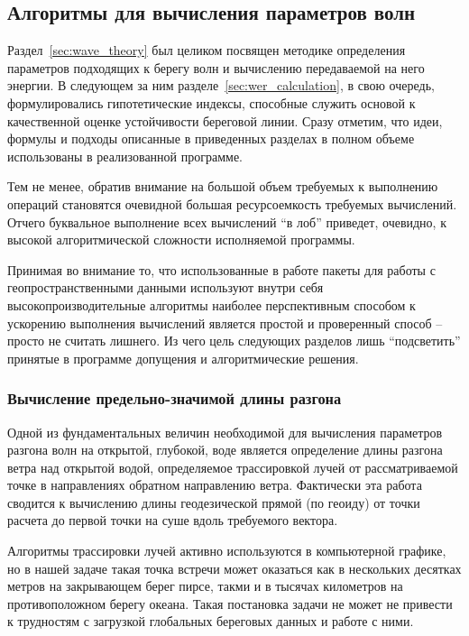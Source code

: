 
\subsection{Алгоритмы для вычисления параметров волн}


Раздел~\ref{sec:wave_theory} был целиком посвящен методике определения параметров подходящих к берегу волн и вычислению передаваемой на него энергии.
В следующем за ним разделе~\ref{sec:wer_calculation}, в свою очередь, формулировались гипотетические индексы, способные служить основой к качественной оценке устойчивости береговой линии.
Сразу отметим, что идеи, формулы и подходы описанные в приведенных разделах в полном объеме использованы в реализованной программе.

Тем не менее, обратив внимание на большой объем требуемых к выполнению операций становятся очевидной большая ресурсоемкость требуемых вычислений. 
Отчего буквальное выполнение всех вычислений \enquote{в лоб} приведет, очевидно, к высокой алгоритмической сложности исполняемой программы.

Принимая во внимание то, что использованные в работе пакеты для работы с геопространственными данными используют внутри себя высокопроизводительные алгоритмы наиболее перспективным способом к ускорению выполнения вычислений является простой и проверенный способ -- просто не считать лишнего.
Из чего цель следующих разделов лишь \enquote{подсветить} принятые в программе допущения и алгоритмические решения.

\subsubsection{Вычисление предельно-значимой длины разгона}

Одной из фундаментальных величин необходимой для вычисления параметров разгона волн на открытой, глубокой, воде является определение длины разгона ветра над открытой водой, определяемое трассировкой лучей от рассматриваемой точке в направлениях обратном направлению ветра.
Фактически эта работа сводится к вычислению длины геодезической прямой (по геоиду) от точки расчета до первой точки на суше вдоль требуемого вектора.

Алгоритмы трассировки лучей активно используются в компьютерной графике, но в нашей задаче такая точка встречи может оказаться как в нескольких десятках метров на закрывающем берег пирсе, такми и в тысячах километров на противоположном берегу океана.
Такая постановка задачи не может не привести к трудностям с загрузкой глобальных береговых данных и работе с ними.

